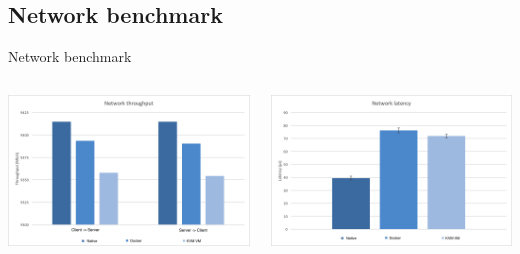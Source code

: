 \subsection{Network benchmark}
\begin{frame}{Network benchmark}
	\begin{columns}
		\begin{column}{0.5\textwidth}
			\centering{}
			\includegraphics[scale=0.14]{images/network-throughput.png}
		\end{column}
		\begin{column}{0.5\textwidth}
			\centering{}
			\includegraphics[scale=0.14]{images/network-latency.png}
		\end{column}
	\end{columns}
\end{frame}

